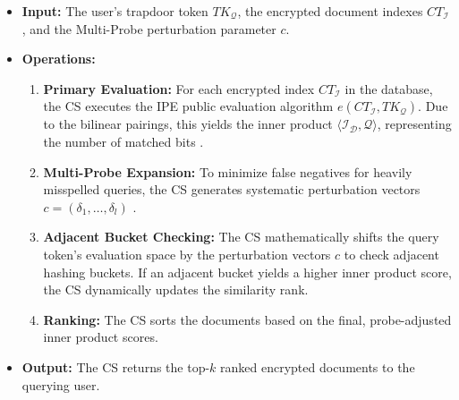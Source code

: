 \begin{itemize}
    \item \textbf{Input:} The user's trapdoor token $TK_{\mathcal{Q}}$, the encrypted document indexes $CT_{\mathcal{I}}$, and the Multi-Probe perturbation parameter $c$.
    \item \textbf{Operations:}
    \begin{enumerate}
        \item \textbf{Primary Evaluation:} For each encrypted index $CT_{\mathcal{I}}$ in the database, the CS executes the IPE public evaluation algorithm $e(CT_{\mathcal{I}}, TK_{\mathcal{Q}})$. Due to the bilinear pairings, this yields the inner product $\langle \mathcal{I_D}, \mathcal{Q} \rangle$, representing the number of matched bits \cite{shen2009predicate}.
        \item \textbf{Multi-Probe Expansion:} To minimize false negatives for heavily misspelled queries, the CS generates systematic perturbation vectors $c = (\delta_1, \dots, \delta_l)$ \cite{lv2007multi}. 
        \item \textbf{Adjacent Bucket Checking:} The CS mathematically shifts the query token's evaluation space by the perturbation vectors $c$ to check adjacent hashing buckets. If an adjacent bucket yields a higher inner product score, the CS dynamically updates the similarity rank.
        \item \textbf{Ranking:} The CS sorts the documents based on the final, probe-adjusted inner product scores. 
    \end{enumerate}
    \item \textbf{Output:} The CS returns the top-$k$ ranked encrypted documents to the querying user.%
\end{itemize}
